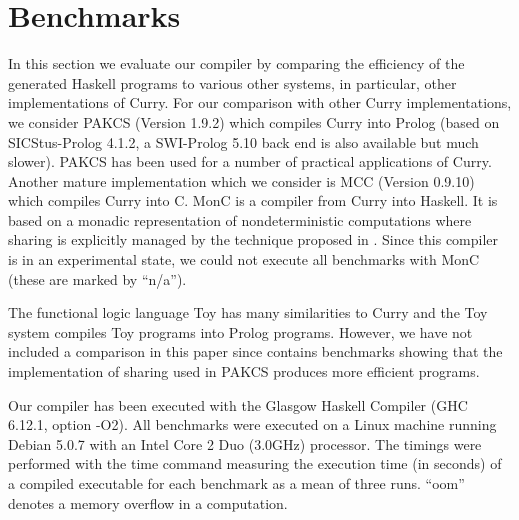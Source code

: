 \documentclass{llncs}
\begin{document}
\section{Benchmarks}
\label{sec:Benchmarks}

In this section we evaluate our compiler by comparing the
efficiency of the generated Haskell programs to various
other systems, in particular, other implementations of Curry.
For our comparison with other Curry implementations,
we consider PAKCS \cite{Hanus10PAKCS} (Version 1.9.2) which compiles
Curry into Prolog \cite{AntoyHanus00FROCOS}
(based on SICStus-Prolog 4.1.2, a SWI-Prolog 5.10 back end is also
available
but much slower). PAKCS has been used for a number of practical
applications of Curry.
Another mature implementation which we consider is MCC \cite{Lux99FLOPS}
(Version 0.9.10) which compiles Curry into C.
MonC \cite{BrasselFischerHanusReck11} is a compiler
from Curry into Haskell. It is based on a monadic representation
of nondeterministic computations where sharing is explicitly
managed by the technique proposed in \cite{FischerKiselyovShan09}.
Since this compiler
is in an experimental state, we could not execute all benchmarks with
MonC (these are marked by ``n/a'').

The functional logic language Toy \cite{Lopez-FraguasSanchez-Hernandez99}
has many similarities to Curry and the Toy system compiles Toy programs
into Prolog programs. However, we have not included a comparison
in this paper since \cite{AntoyHanus00FROCOS} contains benchmarks
showing that the implementation of sharing used in PAKCS produces
more efficient programs.

Our compiler has been executed with the Glasgow Haskell Compiler
(GHC 6.12.1, option -O2). All benchmarks were executed on a Linux machine
running Debian 5.0.7 with an Intel Core 2 Duo (3.0GHz) processor.
The timings were performed with the time command measuring the
execution time (in seconds) of a compiled executable for each benchmark
as a mean of three runs. ``oom'' denotes a memory overflow in a computation.
\end{document}
